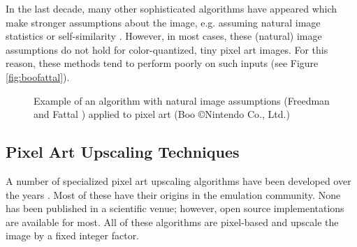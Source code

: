 \documentclass[]{usiinfbachelorproject}
\begin{document}
In the last decade, many other sophisticated algorithms have appeared which make stronger assumptions about the image, e.g. assuming natural image statistics \cite{Fattal2007} or self-similarity \cite{Glasner2009}. However, in most cases, these (natural) image assumptions do not hold for color-quantized, tiny pixel art images. For this reason, these methods tend to perform poorly on such inputs (see Figure \ref{fig:boofattal}).

\begin{figure}[ht]
	\centering
	\caption{Example of an algorithm with natural image assumptions (Freedman and Fattal \cite{Fattal2007}) applied to pixel art (Boo \copyright Nintendo Co., Ltd.)}
\end{figure}


\subsection{Pixel Art Upscaling Techniques} \label{sec:pixelartup}

A number of specialized pixel art upscaling algorithms have been developed over the years \cite{Wiki:scaling}. Most of these have their origins in the emulation community. None has been published in a scientific venue; however, open source implementations are available for most. All of these algorithms are pixel-based and upscale the image by a fixed integer factor.\\
\end{document}
